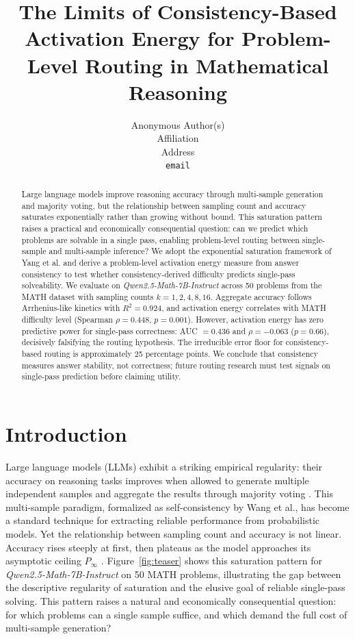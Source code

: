 \documentclass{article}
\title{The Limits of Consistency-Based Activation Energy for Problem-Level Routing in Mathematical Reasoning}
\author{%
  Anonymous Author(s) \\
  Affiliation \\
  Address \\
  \texttt{email} \\
}
\begin{document}
\maketitle

\begin{abstract}
Large language models improve reasoning accuracy through multi-sample generation and majority voting, but the relationship between sampling count and accuracy saturates exponentially rather than growing without bound. This saturation pattern raises a practical and economically consequential question: can we predict which problems are solvable in a single pass, enabling problem-level routing between single-sample and multi-sample inference? We adopt the exponential saturation framework of Yang et al. and derive a problem-level activation energy measure from answer consistency to test whether consistency-derived difficulty predicts single-pass solveability. We evaluate on \textit{Qwen2.5-Math-7B-Instruct} across 50 problems from the MATH dataset with sampling counts $k = 1, 2, 4, 8, 16$. Aggregate accuracy follows Arrhenius-like kinetics with $R^2 = 0.924$, and activation energy correlates with MATH difficulty level (Spearman $\rho = 0.448$, $p = 0.001$). However, activation energy has zero predictive power for single-pass correctness: AUC $= 0.436$ and $\rho = -0.063$ ($p = 0.66$), decisively falsifying the routing hypothesis. The irreducible error floor for consistency-based routing is approximately 25 percentage points. We conclude that consistency measures answer stability, not correctness; future routing research must test signals on single-pass prediction before claiming utility.
\end{abstract}

\section{Introduction}

Large language models (LLMs) exhibit a striking empirical regularity: their accuracy on reasoning tasks improves when allowed to generate multiple independent samples and aggregate the results through majority voting \citep{wang2023selfconsistency}. This multi-sample paradigm, formalized as self-consistency by Wang et al., has become a standard technique for extracting reliable performance from probabilistic models. Yet the relationship between sampling count and accuracy is not linear. Accuracy rises steeply at first, then plateaus as the model approaches its asymptotic ceiling $P_\infty$ \citep{yang2024probabilistic}. Figure~\ref{fig:teaser} shows this saturation pattern for \textit{Qwen2.5-Math-7B-Instruct} on 50 MATH problems, illustrating the gap between the descriptive regularity of saturation and the elusive goal of reliable single-pass solving. This pattern raises a natural and economically consequential question: for which problems can a single sample suffice, and which demand the full cost of multi-sample generation?
\end{document}
